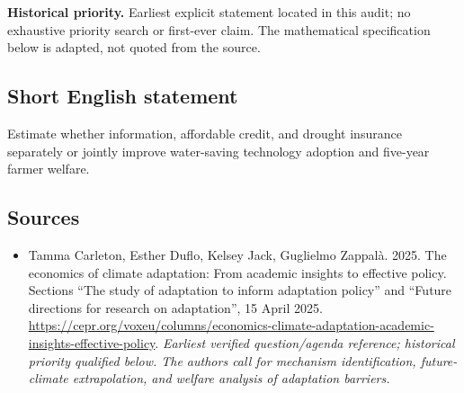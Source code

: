 \documentclass[11pt]{article}
\begin{document}
\par\textbf{Historical priority.} Earliest explicit statement located in this audit; no exhaustive priority search or first-ever claim. The mathematical specification below is adapted, not quoted from the source.

\subsection{Short English statement}
Estimate whether information, affordable credit, and drought insurance separately or jointly improve water-saving technology adoption and five-year farmer welfare.

\subsection{Sources}
\begin{itemize}\raggedright
\item[\textnormal{[S1]}]\hypertarget{source:30007716:1}{} Tamma Carleton, Esther Duflo, Kelsey Jack, Guglielmo Zappalà. 2025. The economics of climate adaptation: From academic insights to effective policy. Sections “The study of adaptation to inform adaptation policy” and “Future directions for research on adaptation”, 15 April 2025.
\url{https://cepr.org/voxeu/columns/economics-climate-adaptation-academic-insights-effective-policy}.
{\small\textit{Earliest verified question/agenda reference; historical priority qualified below. The authors call for mechanism identification, future-climate extrapolation, and welfare analysis of adaptation barriers.}}
\end{itemize}
\end{document}
